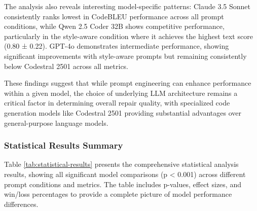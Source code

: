 The analysis also reveals interesting model-specific patterns: Claude 3.5 Sonnet consistently ranks lowest in CodeBLEU performance across all prompt conditions, while Qwen 2.5 Coder 32B shows competitive performance, particularly in the style-aware condition where it achieves the highest text score (0.80 ± 0.22). GPT-4o demonstrates intermediate performance, showing significant improvements with style-aware prompts but remaining consistently below Codestral 2501 across all metrics.

These findings suggest that while prompt engineering can enhance performance within a given model, the choice of underlying LLM architecture remains a critical factor in determining overall repair quality, with specialized code generation models like Codestral 2501 providing substantial advantages over general-purpose language models.

\subsubsection{Statistical Results Summary}
Table \ref{tab:statistical-results} presents the comprehensive statistical analysis results, showing all significant model comparisons (p < 0.001) across different prompt conditions and metrics. The table includes p-values, effect sizes, and win/loss percentages to provide a complete picture of model performance differences.

